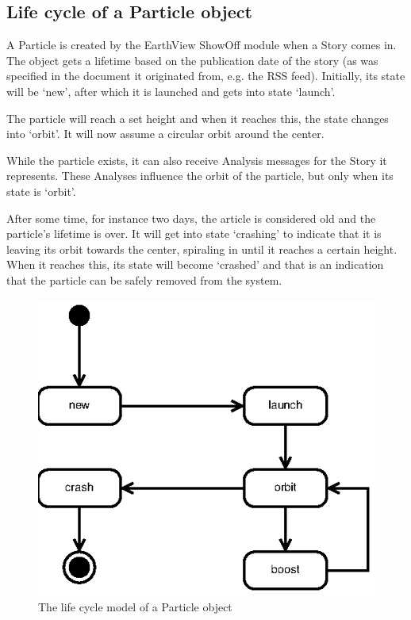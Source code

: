 \subsection{Life cycle of a Particle object}

A Particle is created by the EarthView ShowOff module when a Story comes in.
The object gets a lifetime based on the publication date of the story (as was
specified in the document it originated from, e.g. the RSS feed). Initially,
its state will be `new', after which it is launched and gets into state
`launch'.

The particle will reach a set height and when it reaches this, the state
changes into `orbit'. It will now assume a circular orbit around the center.

While the particle exists, it can also receive Analysis messages for the Story
it represents. These Analyses influence the orbit of the particle, but only
when its state is `orbit'.

After some time, for instance two days, the article is considered old and
the particle's lifetime is over. It will get into state `crashing' to
indicate that it is leaving its orbit towards the center, spiraling in
until it reaches a certain height. When it reaches this, its state will
become `crashed' and that is an indication that the particle can be safely
removed from the system.

\begin{figure}
  \centering
  \includegraphics{image/sequence-diagram-particle}
  \caption{The life cycle model of a Particle object}
\end{figure}

